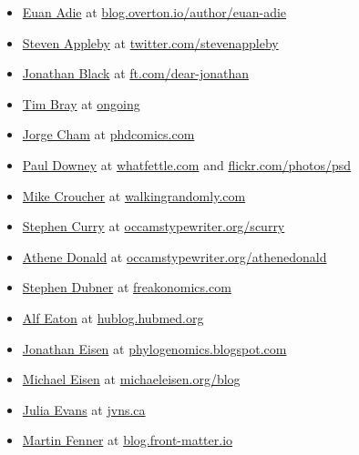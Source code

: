 \documentclass[
]{book}
\providecommand{\tightlist}{%
  \setlength{\itemsep}{0pt}\setlength{\parskip}{0pt}}
\begin{document}
\begin{itemize}
\tightlist
\item
  \href{https://twitter.com/stew}{Euan Adie} at \href{https://blog.overton.io/author/euan-adie}{blog.overton.io/author/euan-adie}
\item
  \href{https://en.wikipedia.org/wiki/Steven_Appleby}{Steven Appleby} at \href{https://twitter.com/stevenappleby}{twitter.com/stevenappleby} \citep{stevenappleby}
\item
  \href{https://www.new.ox.ac.uk/node/1003}{Jonathan Black} at \href{https://www.ft.com/dear-jonathan}{ft.com/dear-jonathan}
\item
  \href{https://en.wikipedia.org/wiki/Tim_Bray}{Tim Bray} at \href{https://www.tbray.org/ongoing/}{ongoing}
\item
  \href{https://en.wikipedia.org/wiki/Jorge_Cham}{Jorge Cham} at \href{https://phdcomics.com/}{phdcomics.com}
\item
  \href{https://twitter.com/psd}{Paul Downey} at \href{https://blog.whatfettle.com/}{whatfettle.com} and \href{https://www.flickr.com/photos/psd/}{flickr.com/photos/psd}
\item
  \href{https://twitter.com/walkingrandomly}{Mike Croucher} at \href{https://walkingrandomly.com/}{walkingrandomly.com}
\item
  \href{https://twitter.com/Stephen_Curry}{Stephen Curry} at \href{https://occamstypewriter.org/scurry}{occamstypewriter.org/scurry}
\item
  \href{https://en.wikipedia.org/wiki/Athene_Donald}{Athene Donald} at \href{http://occamstypewriter.org/athenedonald}{occamstypewriter.org/athenedonald}
\item
  \href{https://en.wikipedia.org/wiki/Stephen_J._Dubner}{Stephen Dubner} at \href{https://freakonomics.com/}{freakonomics.com}
\item
  \href{https://twitter.com/invisiblecomma}{Alf Eaton} at \href{https://hublog.hubmed.org/}{hublog.hubmed.org}
\item
  \href{https://en.wikipedia.org/wiki/Jonathan_Eisen}{Jonathan Eisen} at \href{https://phylogenomics.blogspot.com/}{phylogenomics.blogspot.com}
\item
  \href{https://en.wikipedia.org/wiki/Michael_Eisen}{Michael Eisen} at \href{https://www.michaeleisen.org/blog/}{michaeleisen.org/blog}
\item
  \href{https://twitter.com/b0rk}{Julia Evans} at \href{https://jvns.ca/}{jvns.ca}
\item
  \href{https://twitter.com/mfenner}{Martin Fenner} at \href{https://blog.front-matter.io/}{blog.front-matter.io}

\end{itemize}
\end{document}
